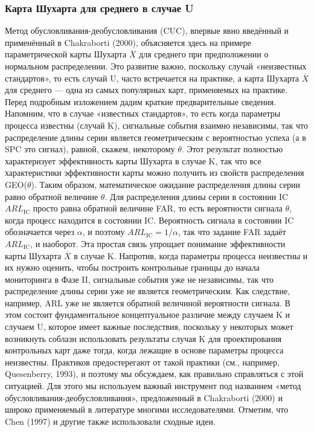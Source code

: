 \subsubsection{Карта Шухарта для среднего в случае U}

Метод обусловливания-деобусловливания (CUC), впервые явно введённый и применённый в Chakraborti (2000), объясняется здесь на примере параметрической карты Шухарта \(\overline{X}\) для среднего при предположении о нормальном распределении. Это развитие важно, поскольку случай «неизвестных стандартов», то есть случай U, часто встречается на практике, а карта Шухарта \(\overline{X}\) для среднего — одна из самых популярных карт, применяемых на практике. Перед подробным изложением дадим краткие предварительные сведения. Напомним, что в случае «известных стандартов», то есть когда параметры процесса известны (случай K), сигнальные события взаимно независимы, так что распределение длины серии является геометрическим с вероятностью успеха (а в SPC это сигнал), равной, скажем, некоторому \(\theta\). Этот результат полностью характеризует эффективность карты Шухарта в случае K, так что все характеристики эффективности карты можно получить из свойств распределения GEO(\(\theta\)). Таким образом, математическое ожидание распределения длины серии равно обратной величине \(\theta\). Для распределения длины серии в состоянии IC \(ARL_{\text{IC}}\) просто равна обратной величине FAR, то есть вероятности сигнала \(\theta\), когда процесс находится в состоянии IC. Вероятность сигнала в состоянии IC обозначается через \(\alpha\), и поэтому \(ARL_{\text{IC}} = 1/\alpha\), так что задание FAR задаёт \(ARL_{\text{IC}}\), и наоборот. Эта простая связь упрощает понимание эффективности карты Шухарта \(\overline{X}\) в случае K. Напротив, когда параметры процесса неизвестны и их нужно оценить, чтобы построить контрольные границы до начала мониторинга в Фазе II, сигнальные события уже не независимы, так что распределение длины серии уже не является геометрическим. Как следствие, например, ARL уже не является обратной величиной вероятности сигнала. В этом состоит фундаментальное концептуальное различие между случаем K и случаем U, которое имеет важные последствия, поскольку у некоторых может возникнуть соблазн использовать результаты случая K для проектирования контрольных карт даже тогда, когда лежащие в основе параметры процесса неизвестны. Практиков предостерегают от такой практики (см., например, Quesenberry, 1993), и поэтому мы обсуждаем, как правильно справляться с этой ситуацией. Для этого мы используем важный инструмент под названием «метод обусловливания-деобусловливания», предложенный в Chakraborti (2000) и широко применяемый в литературе многими исследователями. Отметим, что Chen (1997) и другие также использовали сходные идеи.

